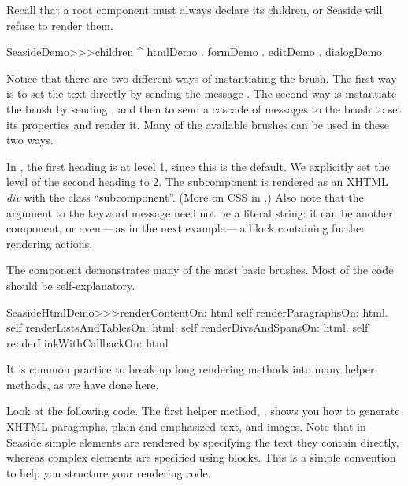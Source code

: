 \documentclass[a4paper,10pt,twoside]{book}
\begin{document}
\noindent
Recall that a root component must always declare its children, or Seaside will refuse to render them.
\begin{code}{}
SeasideDemo>>>children
	^ { htmlDemo . formDemo . editDemo . dialogDemo }
\end{code}

Notice that there are two different ways of instantiating the  brush.
The first way is to set the text directly by sending the message .
The second way is instantiate the brush by sending , and then to send a cascade of messages to the brush to set its properties and render it.
Many of the available brushes can be used in these two ways.



In , the first heading is at level 1, since this is the default.
We explicitly set the level of the second heading to 2.
The subcomponent is rendered as an XHTML \emph{div} with the  class ``subcomponent''.
(More on CSS in .)
Also note that the argument to the  keyword message need not be a literal string: it can be another component, or even\,---\,as in the next example\,---\,a block containing further rendering actions.

The  component demonstrates many of the most basic brushes.
Most of the code should be self-explanatory.

\begin{code}{}
SeasideHtmlDemo>>>renderContentOn: html 
	self renderParagraphsOn: html.
	self renderListsAndTablesOn: html.
	self renderDivsAndSpansOn: html.
	self renderLinkWithCallbackOn: html
\end{code}

It is common practice to break up long rendering methods into many helper methods, as we have done here.


Look at the following code.  
The first helper method, , shows you how to generate XHTML paragraphs, plain and emphasized text, and images.
Note that in Seaside simple elements are rendered by specifying the text they contain directly, whereas complex elements are specified using blocks.
This is a simple convention to help you structure your rendering code.
\end{document}
